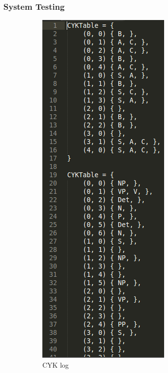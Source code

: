\documentclass{beamer}
\begin{document}
 \begin{frame}
   \frametitle{System Testing}
\begin{figure}
    \centering
    \begin{subfigure}[b]{0.3\textwidth}
        \includegraphics[height=0.75\textheight]{LogCYK.png}
        \caption{CYK log}
        \label{fig:cyk}
    \end{subfigure}
    ~ %
    \begin{subfigure}[b]{0.3\textwidth}

\end{subfigure}
\end{figure}
\end{frame}
\end{document}
